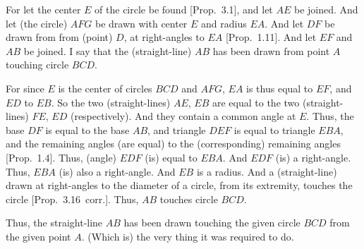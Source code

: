 \begin{Parallel}{}{}
{For let the center $E$ of the circle be found [Prop.~3.1], and let $AE$ be joined. And let (the circle) $AFG$ be drawn with center
$E$ and radius $EA$. And let $DF$ be drawn from from (point) $D$,
at right-angles to $EA$ [Prop.~1.11]. And let $EF$ and $AB$ 
be  joined. I say that the (straight-line) $AB$ has been drawn from  point $A$
touching circle $BCD$.

For since $E$ is the center of circles $BCD$ and $AFG$, $EA$ is thus equal to $EF$,
and $ED$ to $EB$. So the two (straight-lines) $AE$, $EB$ are equal to
the two (straight-lines) $FE$, $ED$ (respectively). And they contain a common angle at $E$.
Thus, the base $DF$ is equal to the base $AB$, and triangle $DEF$ is equal to
triangle $EBA$, and the remaining angles (are equal) to the (corresponding)
remaining angles [Prop.~1.4]. Thus, (angle) $EDF$ (is) equal to $EBA$. And
$EDF$ (is) a right-angle. Thus, $EBA$ (is) also a right-angle. And $EB$ is a radius.
And a (straight-line) drawn at right-angles to the diameter of a circle, from
its extremity,  touches the circle [Prop.~3.16~corr.]. Thus, $AB$ touches circle $BCD$.

Thus, the straight-line $AB$ has been drawn touching the given circle $BCD$ from the given point $A$. (Which is) the very thing it was required to do.}
\end{Parallel}

